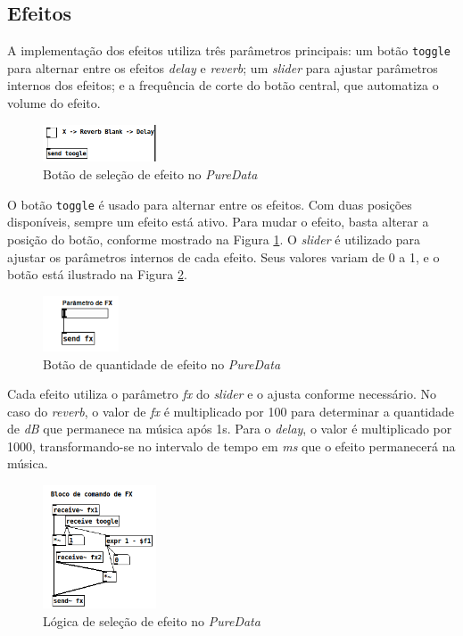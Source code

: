 \subsection{Efeitos}

A implementação dos efeitos utiliza três parâmetros principais: um botão \texttt{toggle} para alternar entre os efeitos \textit{delay} e \textit{reverb}; um \textit{slider} para ajustar parâmetros internos dos efeitos; e a frequência de corte do botão central, que automatiza o volume do efeito.

\begin{figure}[h]
    \centering
    \includegraphics[width=0.3\textwidth]{figuras/fig46.png}
    \caption{Botão de seleção de efeito no \textit{PureData}}
    \label{fig46}
\end{figure}

O botão \texttt{toggle} é usado para alternar entre os efeitos. Com duas posições disponíveis, sempre um efeito está ativo. Para mudar o efeito, basta alterar a posição do botão, conforme mostrado na Figura \ref{fig46}. 
O \textit{slider} é utilizado para ajustar os parâmetros internos de cada efeito. Seus valores variam de 0 a 1, e o botão está ilustrado na Figura \ref{fig47}.

\begin{figure}[h]
    \centering
    \includegraphics[width=0.2\textwidth]{figuras/fig47.png}
    \caption{Botão de quantidade de efeito no \textit{PureData}}
    \label{fig47}
\end{figure}



Cada efeito utiliza o parâmetro \textit{fx} do \textit{slider} e o ajusta conforme necessário. No caso do \textit{reverb}, o valor de \textit{fx} é multiplicado por 100 para determinar a quantidade de \textit{dB} que permanece na música após 1s. Para o \textit{delay}, o valor é multiplicado por 1000, transformando-se no intervalo de tempo em \textit{ms} que o efeito permanecerá na música.

\begin{figure}[h]
    \centering
    \includegraphics[width=0.3\textwidth]{figuras/fig48.png}
    \caption{Lógica de seleção de efeito no \textit{PureData}}
    \label{fig48}
\end{figure}



